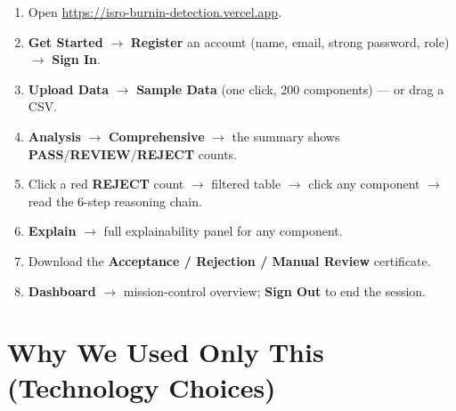 \documentclass[11pt,a4paper]{article}
\newcommand{\keys}[1]{\textbf{\sffamily#1}}
\begin{document}
\begin{enumerate}[leftmargin=1.5em]
  \item Open \url{https://isro-burnin-detection.vercel.app}.
  \item \keys{Get Started} $\rightarrow$ \keys{Register} an account (name, email, strong password,
        role) $\rightarrow$ \keys{Sign In}.
  \item \keys{Upload Data} $\rightarrow$ \keys{Sample Data} (one click, 200 components) --- or drag a
        CSV.
  \item \keys{Analysis} $\rightarrow$ \keys{Comprehensive} $\rightarrow$ the summary shows
        \keys{PASS}/\keys{REVIEW}/\keys{REJECT} counts.
  \item Click a red \keys{REJECT} count $\rightarrow$ filtered table $\rightarrow$ click any
        component $\rightarrow$ read the 6-step reasoning chain.
  \item \keys{Explain} $\rightarrow$ full explainability panel for any component.
  \item Download the \keys{Acceptance / Rejection / Manual Review} certificate.
  \item \keys{Dashboard} $\rightarrow$ mission-control overview; \keys{Sign Out} to end the session.
\end{enumerate}

\section{Why We Used Only This (Technology Choices)}
\end{document}
